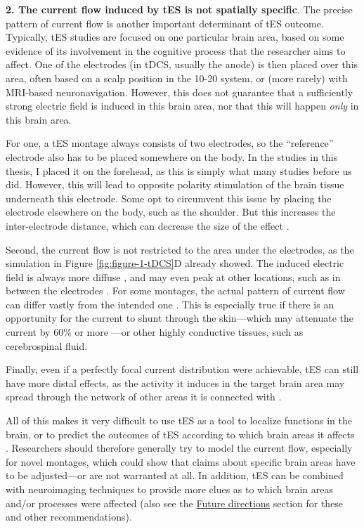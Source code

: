 \documentclass[11pt,]{memoir}
\begin{document}
\textbf{2. The current flow induced by tES is not spatially specific}. The precise pattern of current flow is another important determinant of tES outcome. Typically, tES studies are focused on one particular brain area, based on some evidence of its involvement in the cognitive process that the researcher aims to affect. One of the electrodes (in tDCS, usually the anode) is then placed over this area, often based on a scalp position in the 10-20 system, or (more rarely) with MRI-based neuronavigation. However, this does not guarantee that a sufficiently strong electric field is induced in this brain area, nor that this will happen \emph{only} in this brain area.

For one, a tES montage always consists of two electrodes, so the ``reference'' electrode also has to be placed somewhere on the body. In the studies in this thesis, I placed it on the forehead, as this is simply what many studies before us did. However, this will lead to opposite polarity stimulation of the brain tissue underneath this electrode. Some opt to circumvent this issue by placing the electrode elsewhere on the body, such as the shoulder. But this increases the inter-electrode distance, which can decrease the size of the effect \autocites{Moliadze2010}{Opitz2015}.

Second, the current flow is not restricted to the area under the electrodes, as the simulation in Figure \ref{fig:figure-1-tDCS}D already showed. The induced electric field is always more diffuse \autocite{Opitz2015}, and may even peak at other locations, such as in between the electrodes \autocite{Saturnino2017}. For some montages, the actual pattern of current flow can differ vastly from the intended one \autocite{Karabanov2019}. This is especially true if there is an opportunity for the current to shunt through the skin---which may attenuate the current by 60\% or more \autocite{Voroslakos2018}---or other highly conductive tissues, such as cerebrospinal fluid.

Finally, even if a perfectly focal current distribution were achievable, tES can still have more distal effects, as the activity it induces in the target brain area may spread through the network of other areas it is connected with \autocites{Knotkova2019}{Wokke2015}.

All of this makes it very difficult to use tES as a tool to localize functions in the brain, or to predict the outcomes of tES according to which brain areas it affects \autocite{Karabanov2019}. Researchers should therefore generally try to model the current flow, especially for novel montages, which could show that claims about specific brain areas have to be adjusted---or are not warranted at all. In addition, tES can be combined with neuroimaging techniques to provide more clues as to which brain areas and/or processes were affected (also see the \protect\hyperlink{discussion-future}{Future directions} section for these and other recommendations).
\end{document}
